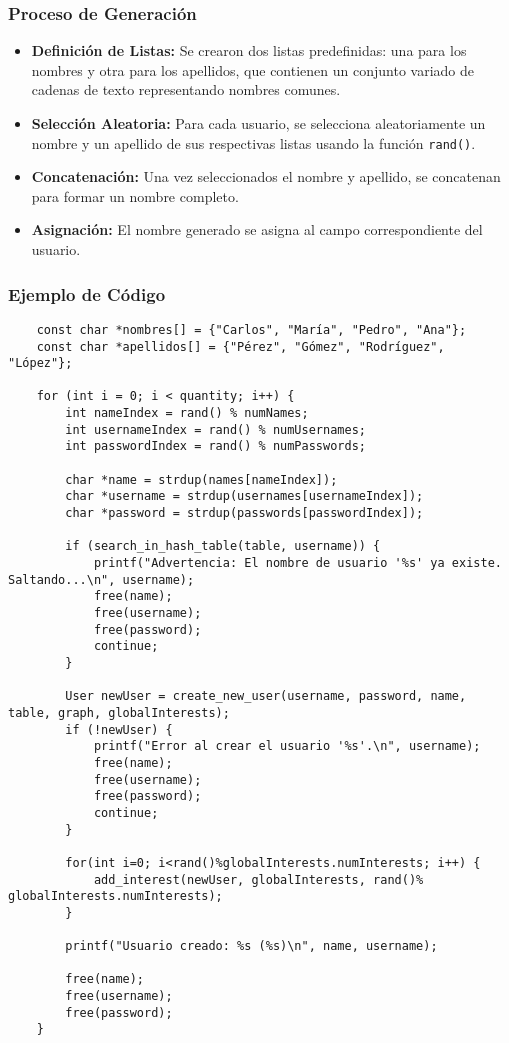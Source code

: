 \documentclass[9pt,letterpaper,onecolumn]{rho-class/rho}
\begin{document}
    \subsubsection{Proceso de Generación}
    \begin{itemize}
        \item \textbf{Definición de Listas:} Se crearon dos listas predefinidas: una para los nombres y otra para los apellidos, que contienen un conjunto variado de cadenas de texto representando nombres comunes.
        \item \textbf{Selección Aleatoria:} Para cada usuario, se selecciona aleatoriamente un nombre y un apellido de sus respectivas listas usando la función \texttt{rand()}.
        \item \textbf{Concatenación:} Una vez seleccionados el nombre y apellido, se concatenan para formar un nombre completo.
        \item \textbf{Asignación:} El nombre generado se asigna al campo correspondiente del usuario.
    \end{itemize}

    \subsubsection{Ejemplo de Código}
    \begin{verbatim}
    const char *nombres[] = {"Carlos", "María", "Pedro", "Ana"};
    const char *apellidos[] = {"Pérez", "Gómez", "Rodríguez", "López"};

    for (int i = 0; i < quantity; i++) {
        int nameIndex = rand() % numNames;
        int usernameIndex = rand() % numUsernames;
        int passwordIndex = rand() % numPasswords;

        char *name = strdup(names[nameIndex]);
        char *username = strdup(usernames[usernameIndex]);
        char *password = strdup(passwords[passwordIndex]);

        if (search_in_hash_table(table, username)) {
            printf("Advertencia: El nombre de usuario '%s' ya existe. Saltando...\n", username);
            free(name);
            free(username);
            free(password);
            continue;
        }

        User newUser = create_new_user(username, password, name, table, graph, globalInterests);
        if (!newUser) {
            printf("Error al crear el usuario '%s'.\n", username);
            free(name);
            free(username);
            free(password);
            continue;
        }

        for(int i=0; i<rand()%globalInterests.numInterests; i++) {
            add_interest(newUser, globalInterests, rand()% globalInterests.numInterests);
        }

        printf("Usuario creado: %s (%s)\n", name, username);

        free(name);
        free(username);
        free(password);
    }
    \end{verbatim}
\end{document}
